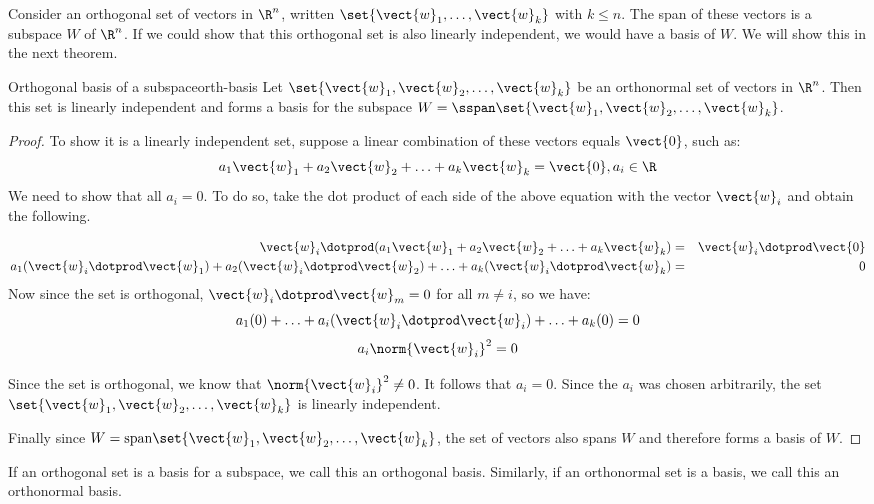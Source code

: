 Consider an orthogonal set of vectors in $\R^n$, written $\set{
\vect{w}_1,\ldots, \vect{w}_k}$ with $k \leq n$. The span of these
vectors is a subspace $W$ of $\R^n$. If we
could show that this orthogonal set is also linearly independent, we
would have a basis of $W$. We will show this in the next theorem.

\begin{theorem}{Orthogonal basis of a subspace}{orth-basis}
Let $ \set{\vect{w}_1, \vect{w}_2,\ldots, \vect{w}_k}$ be an
orthonormal set of vectors in $\R^n$. Then this set is
linearly independent and forms a basis for the subspace $W =
\sspan \set{\vect{w}_1, \vect{w}_2,\ldots, \vect{w}_k}$.
\end{theorem}

\begin{proof}
To show it is a linearly independent set, suppose a linear combination
of these vectors equals $\vect{0}$, such as:
\[
a_1 \vect{w}_1 + a_2 \vect{w}_2 + \ldots + a_k \vect{w}_k = \vect{0}, a_i \in \R
\]
We need to show that all $a_i = 0$. To do so, take the dot product of
each side of the above equation with the vector $\vect{w}_i$ and obtain the following.

\begin{eqnarray*}
\vect{w}_i \dotprod (a_1 \vect{w}_1 + a_2 \vect{w}_2 + \ldots + a_k \vect{w}_k ) &=& \vect{w}_i \dotprod \vect{0}\\
a_1 (\vect{w}_i \dotprod \vect{w}_1) + a_2 (\vect{w}_i \dotprod \vect{w}_2) + \ldots + a_k (\vect{w}_i \dotprod \vect{w}_k)  &=& 0
\end{eqnarray*}
Now since the set is orthogonal, $\vect{w}_i \dotprod \vect{w}_m = 0$ for all $m \neq i$, so we have:
\[
a_1 (0) + \ldots + a_i(\vect{w}_i \dotprod \vect{w}_i) + \ldots + a_k (0) = 0
\]
\[
a_i \norm{\vect{w}_i}^2 = 0
\]

Since the set is orthogonal, we know that $\norm{\vect{w}_i}^2  \neq 0$. It follows that $a_i =0$. Since the $a_i$ was chosen arbitrarily, the set $\set{\vect{w}_1, \vect{w}_2,\ldots, \vect{w}_k}$ is linearly independent.

Finally since $W = \mbox{span} \set{\vect{w}_1, \vect{w}_2,\ldots,
\vect{w}_k}$, the set of vectors also spans $W$ and therefore forms a basis of $W$.

\end{proof}

If an orthogonal set is a basis for a subspace, we call this an
orthogonal basis. Similarly, if an orthonormal set is a basis, we call
this an orthonormal basis.

